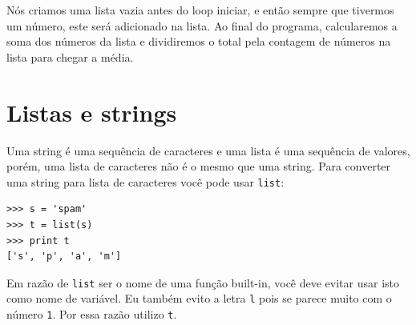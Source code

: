 Nós criamos uma lista vazia antes do loop iniciar, e então sempre que tivermos
um número, este será adicionado na lista. Ao final do programa, calcularemos
a soma dos números da lista e dividiremos o total pela contagem de números na lista para chegar
a média.

\section{Listas e strings}


Uma string é uma sequência de caracteres e uma lista é uma sequência de valores,
porém, uma lista de caracteres não é o mesmo que uma string. Para converter uma
string para lista de caracteres você pode usar {\tt list}:


\beforeverb
\begin{verbatim}
>>> s = 'spam'
>>> t = list(s)
>>> print t
['s', 'p', 'a', 'm']
\end{verbatim}
\afterverb
%

Em razão de {\tt list} ser o nome de uma função built-in, você deve evitar
usar isto como nome de variável. Eu também evito a letra {\tt l} pois se parece muito
com o número {\tt 1}. Por essa razão utilizo {\tt t}.

